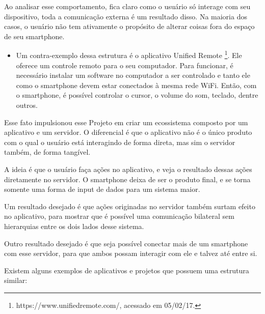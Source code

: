 \documentclass[a4paper,12pt]{article}
\begin{document}
Ao analisar esse comportamento, fica claro como o usuário só interage com seu dispositivo, toda a comunicação externa é um resultado disso. Na maioria dos casos, o usuário não tem ativamente o propósito de alterar coisas fora do espaço de seu smartphone.

\begin{itemize}

    \item Um contra-exemplo dessa estrutura é o aplicativo Unified Remote \footnote{https://www.unifiedremote.com/, acessado em 05/02/17.}. Ele oferece um controle remoto para o seu computador. Para funcionar, é necessário instalar um software no computador a ser controlado e tanto ele como o smartphone devem estar conectados à mesma rede WiFi. Então, com o smartphone, é possível controlar o cursor, o volume do som, teclado, dentre outros.

\end{itemize}

Esse fato impulsionou esse Projeto em criar um ecossistema composto por um aplicativo e um servidor. O diferencial é que o aplicativo não é o único produto com o qual o usuário está interagindo de forma direta, mas sim o servidor também, de forma tangível.

A ideia é que o usuário faça ações no aplicativo, e veja o resultado dessas ações diretamente no servidor. O smartphone deixa de ser o produto final, e se torna somente uma forma de input de dados para um sistema maior.

Um resultado desejado é que ações originadas no servidor também surtam efeito no aplicativo, para mostrar que é possível uma comunicação bilateral sem hierarquias entre os dois lados desse sistema.

Outro resultado desejado é que seja possível conectar mais de um smartphone com esse servidor, para que ambos possam interagir com ele e talvez até entre si.


Existem alguns exemplos de aplicativos e projetos que possuem uma estrutura similar:
\end{document}
